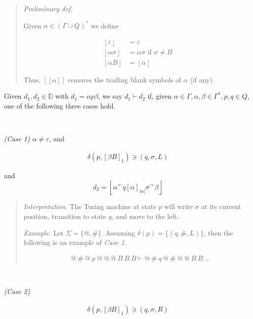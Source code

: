 \documentclass[a4paper, 12pt]{article}
\begin{document}
\small
\begin{quote}
\textit{Preliminary def. }

Given $\alpha \in (\Gamma \cup Q)^*$ we define 

\begin{align*}
    \left\lfloor \varepsilon \right\rfloor  &= \varepsilon \\ 
    \left\lfloor \alpha \sigma  \right\rfloor  &= \alpha \sigma \text{   if } \sigma \neq B \\ 
    \left\lfloor \alpha B \right\rfloor &= \left\lfloor  \alpha \right\rfloor
\end{align*}

Thus, $[[ \alpha ]]$ removes the trailing blank symbols of $\alpha$ (if any).
\end{quote}
\normalsize 

Given $d_1, d_2 \in \mathbb{D}$ with $d_1 = \alpha p \beta $, we say $d_1 \vdash
d_2$ if, given $\alpha \in \Gamma, \alpha, \beta \in  \Gamma^*, p, q \in Q$, one
of the following three cases hold.

~

\textit{(Case 1)} $\alpha \neq \varepsilon$, and

\begin{align*}
    \delta \left( p, \left[ \beta B \right]_1  \right) \ni (q, \sigma, L)
\end{align*}

and 
$$d_2 = \left\lfloor \alpha {}^{\curvearrowleft} q [\alpha]_{|\alpha|} \sigma
{}^{\curvearrowright} \beta  \right\rfloor$$

\small 
\begin{quote}
    \textit{Interpretation.} The Turing machine at state $p$ will write $\sigma$
    at its current position, transition to state $q$, and move to the left. 

    \textit{Example.} Let $\Sigma = \{ @, \#\}$. Assuming $\delta (p) = \{ (q,
    \#, L) \}$, then the following is an example of
    \textit{Case 1}.
    
    \begin{align*}
        &@ ~ \# ~ @ ~ p ~ @ ~ @ ~ @ ~ B ~ B ~ B \vdash  @ ~ \# ~q ~ @ ~ \# ~ @ ~ @ ~ B ~ B
        ~ \ldots
    \end{align*}
\end{quote}
\normalsize 

~ 

\textit{(Case 2)} 

\begin{align*}
    \delta \left( p, \left[ \beta B \right]_1  \right) \ni (q, \sigma, R)
\end{align*}
\end{document}
